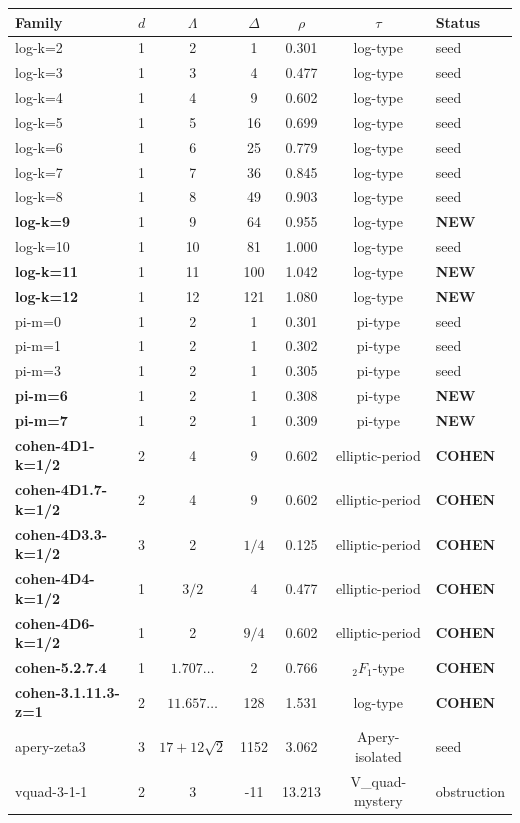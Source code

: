 \documentclass[11pt]{article}
\begin{document}
\begin{center}
\scriptsize
\begin{tabular}{@{}lcccccl@{}}
\toprule
Family & $d$ & $\Lambda$ & $\Delta$ & $\rho$ & $\tau$ & Status \\
\midrule
log-k=2 & 1 & 2 & 1 & 0.301 & log-type & seed \\
log-k=3 & 1 & 3 & 4 & 0.477 & log-type & seed \\
log-k=4 & 1 & 4 & 9 & 0.602 & log-type & seed \\
log-k=5 & 1 & 5 & 16 & 0.699 & log-type & seed \\
log-k=6 & 1 & 6 & 25 & 0.779 & log-type & seed \\
log-k=7 & 1 & 7 & 36 & 0.845 & log-type & seed \\
log-k=8 & 1 & 8 & 49 & 0.903 & log-type & seed \\
\textbf{log-k=9} & 1 & 9 & 64 & 0.955 & log-type & \textbf{NEW} \\
log-k=10 & 1 & 10 & 81 & 1.000 & log-type & seed \\
\textbf{log-k=11} & 1 & 11 & 100 & 1.042 & log-type & \textbf{NEW} \\
\textbf{log-k=12} & 1 & 12 & 121 & 1.080 & log-type & \textbf{NEW} \\
pi-m=0 & 1 & 2 & 1 & 0.301 & pi-type & seed \\
pi-m=1 & 1 & 2 & 1 & 0.302 & pi-type & seed \\
pi-m=3 & 1 & 2 & 1 & 0.305 & pi-type & seed \\
\textbf{pi-m=6} & 1 & 2 & 1 & 0.308 & pi-type & \textbf{NEW} \\
\textbf{pi-m=7} & 1 & 2 & 1 & 0.309 & pi-type & \textbf{NEW} \\
\textbf{cohen-4D1-k=1/2} & 2 & 4 & 9 & 0.602 & elliptic-period & \textbf{COHEN} \\
\textbf{cohen-4D1.7-k=1/2} & 2 & 4 & 9 & 0.602 & elliptic-period & \textbf{COHEN} \\
\textbf{cohen-4D3.3-k=1/2} & 3 & 2 & $1/4$ & 0.125 & elliptic-period & \textbf{COHEN} \\
\textbf{cohen-4D4-k=1/2} & 1 & $3/2$ & 4 & 0.477 & elliptic-period & \textbf{COHEN} \\
\textbf{cohen-4D6-k=1/2} & 1 & 2 & $9/4$ & 0.602 & elliptic-period & \textbf{COHEN} \\
\textbf{cohen-5.2.7.4} & 1 & $1.707\ldots$ & 2 & 0.766 & ${}_2F_1$-type & \textbf{COHEN} \\
\textbf{cohen-3.1.11.3-z=1} & 2 & $11.657\ldots$ & 128 & 1.531 & log-type & \textbf{COHEN} \\
apery-zeta3 & 3 & $17+12\sqrt2$ & 1152 & 3.062 & Apery-isolated & seed \\
vquad-3-1-1 & 2 & 3 & -11 & 13.213 & V\_quad-mystery & obstruction \\
\bottomrule
\end{tabular}
\end{center}
\end{document}
